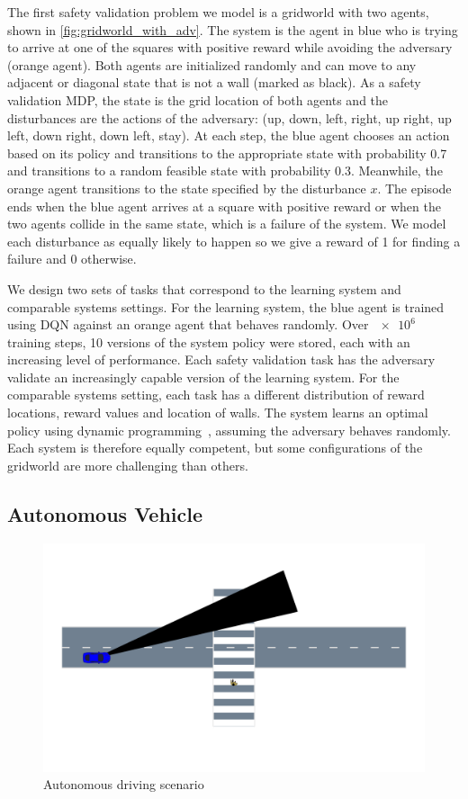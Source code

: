 The first safety validation problem we model is a gridworld with two agents, shown in \cref{fig:gridworld_with_adv}. The system is the agent in blue who is trying to arrive at one of the squares with positive reward while avoiding the adversary (orange agent). Both agents are initialized randomly and can move to any adjacent or diagonal state that is not a wall (marked as black). As a safety validation MDP, the state is the grid location of both agents and the disturbances are the actions of the adversary: (up, down, left, right, up right, up left, down right, down left, stay). At each step, the blue agent chooses an action based on its policy and transitions to the appropriate state with probability \num{0.7} and transitions to a random feasible state with probability \num{0.3}.  Meanwhile, the orange agent transitions to the state specified by the disturbance $x$. The episode ends when the blue agent arrives at a square with positive reward or when the two agents collide in the same state, which is a failure of the system. We model each disturbance as equally likely to happen so we give a reward of \num{1} for finding a failure and \num{0} otherwise.  

We design two sets of tasks that correspond to the learning system and comparable systems settings. For the learning system, the blue agent is trained using DQN against an orange agent that behaves randomly. Over $\num{e6}$ training steps, \num{10} versions of the system policy were stored, each with an increasing level of performance. Each safety validation task has the adversary validate an increasingly capable version of the learning system. For the comparable systems setting, each task has a different distribution of reward locations, reward values and location of walls. The system learns an optimal policy using dynamic programming~\cite{dmubook}, assuming the adversary behaves randomly. Each system is therefore equally competent, but some configurations of the gridworld are more challenging than others.


\subsection{Autonomous Vehicle}
\begin{figure}
\centering
\includegraphics[trim={0 7cm 10cm 6.5cm},clip, width=0.7\linewidth]{figures/iterative_validation/blindspot.pdf}
\caption{Autonomous driving scenario}
\label{fig:av_blindspot}
\end{figure}

